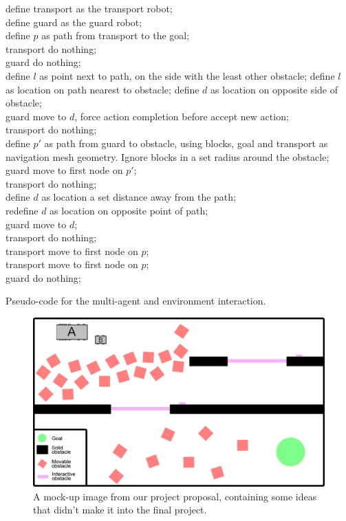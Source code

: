 \documentclass[10pt, abstracton, twocolumn]{scrartcl}
\begin{document}
\begin{appendices}
\begin{algorithm}
define transport as the transport robot; \\
define guard as the guard robot; \\
define $p$ as path from transport to the goal; \\
{
transport do nothing; \\
guard do nothing; \\
}
{
{
{
define $l$ as point next to path, on the side with the least other obstacle;
}
{
define $l$ as location on path nearest to obstacle;
}
{
define $d$ as location on opposite side of obstacle; \\
guard move to $d$, force action completion before accept new action; \\
transport do nothing; \\
}
{
define $p'$ as path from guard to obstacle, using blocks, goal and transport as navigation mesh geometry. Ignore blocks in a set radius around the obstacle; \\
guard move to first node on $p'$; \\
transport do nothing; \\
}
}
{
define $d$ as location a set distance away from the path; \\
{
redefine $d$ as location on opposite point of path; \\
}
guard move to $d$; \\
{
transport do nothing; \\
}
{
transport move to first node on $p$; \\
}
}
\uElse
{
transport move to first node on $p$; \\
guard do nothing;
}
}
\caption{Pseudo-code for the multi-agent and environment interaction.}
\label{alg:multiagent}
\end{algorithm}

\begin{figure}[h]
	\centering
	\includegraphics[width=\columnwidth]{pictures/proposalImage.png}
	\caption{\small A mock-up image from our project proposal, containing some ideas that didn't make it into the final project.}
	\label{fig:proposal}
\end{figure}


\end{appendices}
\end{document}
